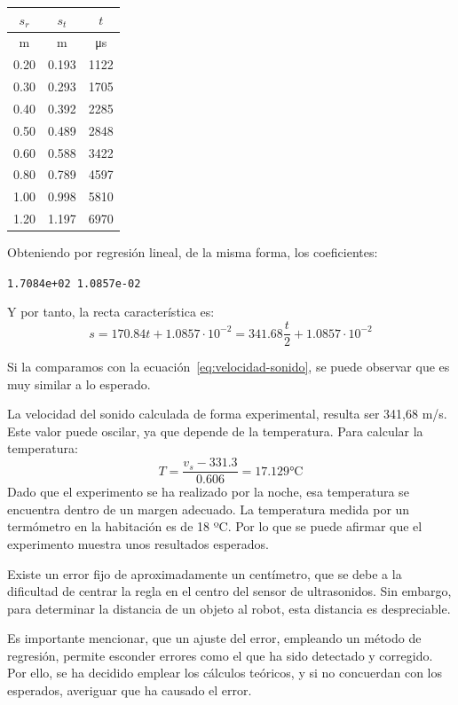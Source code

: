 \documentclass[10pt,a4paper,hidelinks]{article}
\begin{document}
\begin{multicols}{2}

\begin{center}
\begin{tabular}{ | c | c | c | }
\hline
$s_{r}$ & $s_{t}$ & $t$\\ \hline
m & m & \si{\micro\second} \\ \hline \hline
0.20 & 0.193 & 1122 \\ \hline
0.30 & 0.293 & 1705 \\ \hline
0.40 & 0.392 & 2285 \\ \hline
0.50 & 0.489 & 2848 \\ \hline
0.60 & 0.588 & 3422 \\ \hline
0.80 & 0.789 & 4597 \\ \hline
1.00 & 0.998 & 5810 \\ \hline
1.20 & 1.197 & 6970 \\ \hline
\end{tabular}
\end{center}

Obteniendo por regresión lineal, de la misma forma, los coeficientes:
\begin{center}
\texttt{1.7084e+02   1.0857e-02}
\end{center}
Y por tanto, la recta característica es:
$$ s = 170.84 t + 1.0857\cdot 10^{-2} = 341.68\frac{t}{2} + 1.0857\cdot 10^{-2}
$$

Si la comparamos con la ecuación~\ref{eq:velocidad-sonido}, se puede observar 
que es muy similar a lo esperado.

La velocidad del sonido calculada de forma experimental, resulta ser 341,68 m/s.  
Este valor puede oscilar, ya que depende de la temperatura. Para calcular la 
temperatura:
$$ T = \frac{v_{s}-331.3}{0.606} = 17.129 \si{\celsius} $$
Dado que el experimento se ha realizado por la noche, esa temperatura se 
encuentra dentro de un margen adecuado. La temperatura medida por un termómetro 
en la habitación es de 18 ºC. Por lo que se puede afirmar que el experimento 
muestra unos resultados esperados.

Existe un error fijo de aproximadamente un centímetro, que se debe a la 
dificultad de centrar la regla en el centro del sensor de ultrasonidos. Sin 
embargo, para determinar la distancia de un objeto al robot, esta distancia es 
despreciable.

Es importante mencionar, que un ajuste del error, empleando un método de 
regresión, permite esconder errores como el que ha sido detectado y corregido.  
Por ello, se ha decidido emplear los cálculos teóricos, y si no concuerdan con 
los esperados, averiguar que ha causado el error.


\end{multicols}
\end{document}
